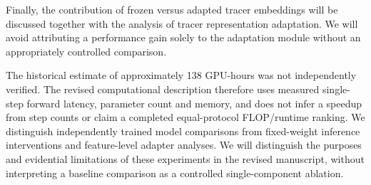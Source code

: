 {Finally, the contribution of frozen versus adapted tracer embeddings will be discussed together with the analysis of tracer representation adaptation. We will avoid attributing a performance gain solely to the adaptation module without an appropriately controlled comparison.

The historical estimate of approximately 138 GPU-hours was not independently verified. The revised computational description therefore uses measured single-step forward latency, parameter count and memory, and does not infer a speedup from step counts or claim a completed equal-protocol FLOP/runtime ranking. We distinguish independently trained model comparisons from fixed-weight inference interventions and feature-level adapter analyses. We will distinguish the purposes and evidential limitations of these experiments in the revised manuscript, without interpreting a baseline comparison as a controlled single-component ablation.}


